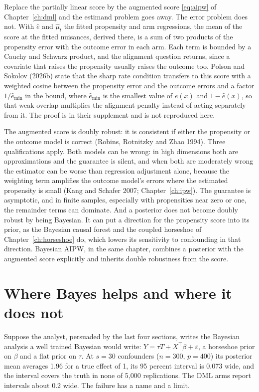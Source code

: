 Replace the partially linear score by the augmented score \eqref{eq:aipw} of Chapter~\ref{ch:dml} and the estimand problem goes away. The error problem does not. With $\hat e$ and $\hat\mu_t$ the fitted propensity and arm regressions, the mean of the score at the fitted nuisances, derived there, is a sum of two products of the propensity error with the outcome error in each arm.
Each term is bounded by a Cauchy and Schwarz product, and the alignment question returns, since a covariate that raises the propensity usually raises the outcome too. Polson and Sokolov (2026b) state that the sharp rate condition transfers to this score with a weighted cosine between the propensity error and the outcome errors and a factor $1/\hat e_{\min}$ in the bound, where $\hat e_{\min}$ is the smallest value of $\hat e(x)$ and $1 - \hat e(x)$, so that weak overlap multiplies the alignment penalty instead of acting separately from it. The proof is in their supplement and is not reproduced here.

The augmented score is doubly robust: it is consistent if either the propensity or the outcome model is correct (Robins, Rotnitzky and Zhao 1994). Three qualifications apply. Both models can be wrong: in high dimensions both are approximations and the guarantee is silent, and when both are moderately wrong the estimator can be worse than regression adjustment alone, because the weighting term amplifies the outcome model's errors where the estimated propensity is small (Kang and Schafer 2007; Chapter~\ref{ch:ipw}). The guarantee is asymptotic, and in finite samples, especially with propensities near zero or one, the remainder terms can dominate. And a posterior does not become doubly robust by being Bayesian. It can put a direction for the propensity score into its prior, as the Bayesian causal forest and the coupled horseshoe of Chapter~\ref{ch:horseshoe} do, which lowers its sensitivity to confounding in that direction. Bayesian AIPW, in the same chapter, combines a posterior with the augmented score explicitly and inherits double robustness from the score.

\section{Where Bayes helps and where it does not}\label{sec:crit:bayes}

Suppose the analyst, persuaded by the last four sections, writes the Bayesian analysis a well trained Bayesian would write: $Y = \tau T + X^\top\beta + \varepsilon$, a horseshoe prior on $\beta$ and a flat prior on $\tau$. At $s = 30$ confounders ($n = 300$, $p = 400$) its posterior mean averages 1.96 for a true effect of 1, its 95 percent interval is 0.073 wide, and the interval covers the truth in none of 5,000 replications. The DML arms report intervals about 0.2 wide. The failure has a name and a limit.


